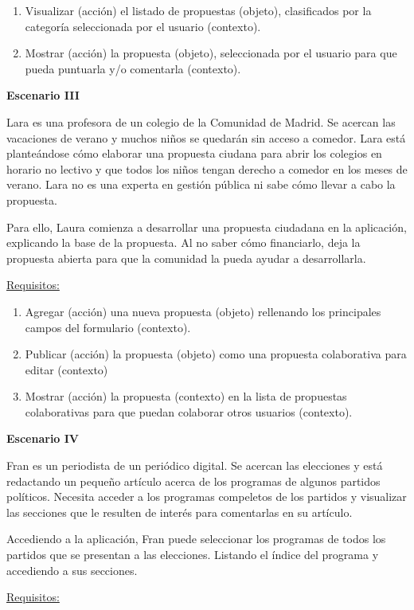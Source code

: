 \begin{enumerate}
\item Visualizar (acción) el listado de propuestas (objeto), clasificados por la categoría seleccionada por el usuario (contexto).
\item Mostrar (acción) la propuesta (objeto), seleccionada por el usuario para que pueda puntuarla y/o comentarla (contexto).
\end{enumerate}

\textbf{Escenario III}

Lara es una profesora de un colegio de la Comunidad de Madrid. Se acercan las vacaciones de verano y muchos niños se quedarán sin acceso a comedor. Lara está planteándose cómo elaborar una propuesta ciudana para abrir los colegios en horario no lectivo y que todos los niños tengan derecho a comedor en los meses de verano. Lara no es una experta en gestión pública ni sabe cómo llevar a cabo la propuesta.

Para ello, Laura comienza a desarrollar una propuesta ciudadana en la aplicación, explicando la base de la propuesta. Al no saber cómo financiarlo, deja la propuesta abierta para que la comunidad la pueda ayudar a desarrollarla.

\underline{Requisitos:}
\begin{enumerate}
\item Agregar (acción) una nueva propuesta (objeto) rellenando los principales campos del formulario (contexto).
\item Publicar (acción) la propuesta (objeto) como una propuesta colaborativa para editar (contexto)
\item Mostrar (acción) la propuesta (contexto) en la lista de propuestas colaborativas para que puedan colaborar otros usuarios (contexto).
\end{enumerate}

\textbf{Escenario IV}

Fran es un periodista de un periódico digital. Se acercan las elecciones y está redactando un pequeño artículo acerca de los programas de algunos partidos políticos. Necesita acceder a los programas compeletos de los partidos y visualizar las secciones que le resulten de interés para comentarlas en su artículo.

Accediendo a la aplicación, Fran puede seleccionar los programas de todos los partidos que se presentan a las elecciones. Listando el índice del programa y accediendo a sus secciones.

\underline{Requisitos:}

